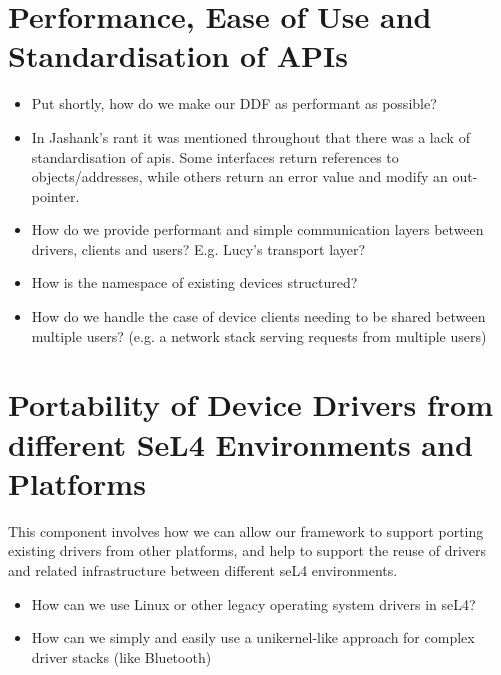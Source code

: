 \documentclass[a4paper,12pt]{report}
\begin{document}
\section{Performance, Ease of Use and Standardisation of APIs}

\begin{itemize}
\item Put shortly, how do we make our DDF as performant as possible?
\item In Jashank's rant it was mentioned throughout that there was a
  lack of standardisation of \glspl{api}. Some interfaces return references
  to objects/addresses, while others return an error value and modify
  an out-pointer.
\item How do we provide performant and simple communication layers
  between drivers, clients and users? E.g. Lucy's transport layer?
\item How is the namespace of existing devices structured?
\item How do we handle the case of device clients needing to be shared
  between multiple users? (e.g. a network stack serving requests from
  multiple users)
\end{itemize}

\section{Portability of Device Drivers from different SeL4
  Environments and Platforms}

This component involves how we can allow our framework to support
porting existing drivers from other platforms, and help to support the
reuse of drivers and related infrastructure between different seL4
environments.

\begin{itemize}
\item How can we use Linux or other legacy operating
  system drivers in seL4?
\item How can we simply and easily use a unikernel-like approach for
  complex driver stacks (like Bluetooth)
\end{itemize}

\fi                             %
\end{document}
